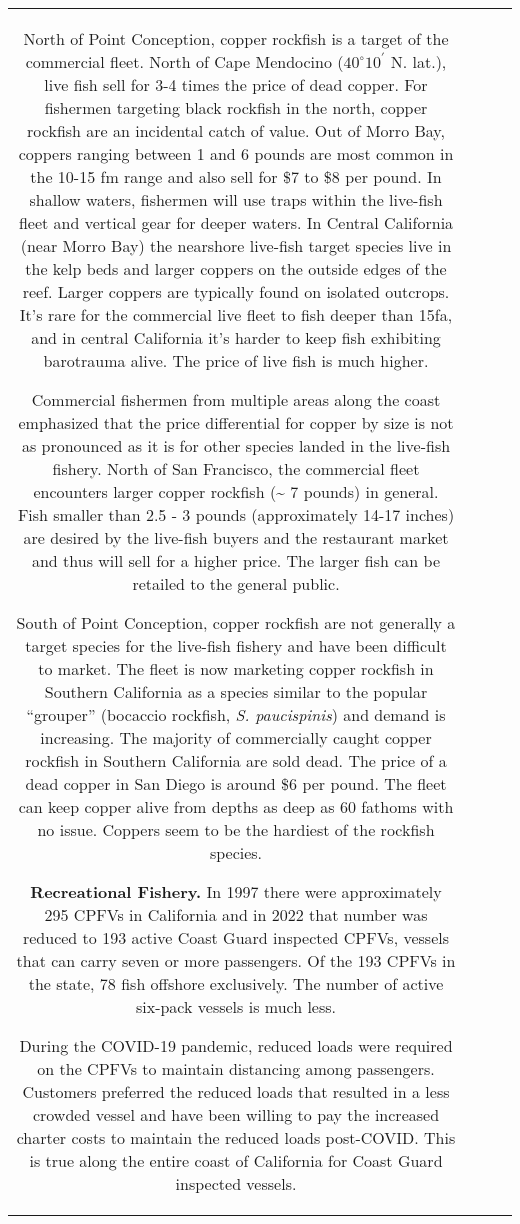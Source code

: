 \documentclass[11pt,
  letterpaper,
]{article}
\begin{document}
\begin{longtable}[t]{c>{\centering\arraybackslash}p{2cm}>{\centering\arraybackslash}p{2cm}>{\centering\arraybackslash}p{2cm}}
North of Point Conception, copper rockfish is a target of the commercial fleet. North of Cape Mendocino ($40^\circ 10^\prime$ N. lat.), live fish sell for 3-4 times the price of dead copper. For fishermen targeting black rockfish in the north, copper rockfish are an incidental catch of value. Out of Morro Bay, coppers ranging between 1 and 6 pounds are most common in the 10-15 fm range and also sell for \$7 to \$8 per pound. In shallow waters, fishermen will use traps within the live-fish fleet and vertical gear for deeper waters. In Central California (near Morro Bay) the nearshore live-fish target species live in the kelp beds and larger coppers on the outside edges of the reef. Larger coppers are typically found on isolated outcrops. It's rare for the commercial live fleet to fish deeper than 15fa, and in central California it's harder to keep fish exhibiting barotrauma alive. The price of live fish is much higher.

Commercial fishermen from multiple areas along the coast emphasized that the price differential for copper by size is not as pronounced as it is for other species landed in the live-fish fishery. North of San Francisco, the commercial fleet encounters larger copper rockfish (\textasciitilde{} 7 pounds) in general. Fish smaller than 2.5 - 3 pounds (approximately 14-17 inches) are desired by the live-fish buyers and the restaurant market and thus will sell for a higher price. The larger fish can be retailed to the general public.

South of Point Conception, copper rockfish are not generally a target species for the live-fish fishery and have been difficult to market. The fleet is now marketing copper rockfish in Southern California as a species similar to the popular ``grouper'' (bocaccio rockfish, \emph{S. paucispinis}) and demand is increasing. The majority of commercially caught copper rockfish in Southern California are sold dead. The price of a dead copper in San Diego is around \$6 per pound. The fleet can keep copper alive from depths as deep as 60 fathoms with no issue. Coppers seem to be the hardiest of the rockfish species.

\textbf{Recreational Fishery.} In 1997 there were approximately 295 CPFVs in California and in 2022 that number was reduced to 193 active Coast Guard inspected CPFVs, vessels that can carry seven or more passengers. Of the 193 CPFVs in the state, 78 fish offshore exclusively. The number of active six-pack vessels is much less.

During the COVID-19 pandemic, reduced loads were required on the CPFVs to maintain distancing among passengers. Customers preferred the reduced loads that resulted in a less crowded vessel and have been willing to pay the increased charter costs to maintain the reduced loads post-COVID. This is true along the entire coast of California for Coast Guard inspected vessels.


\end{longtable}
\end{document}
